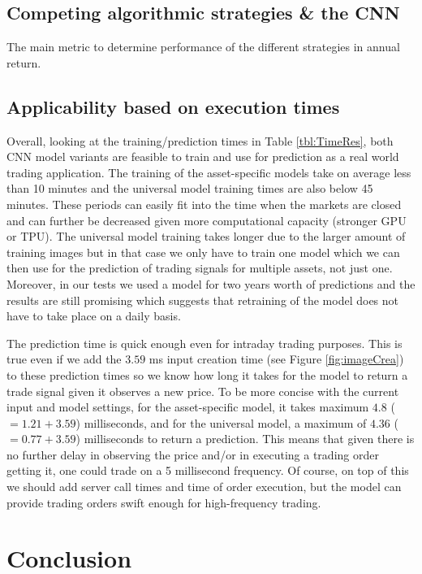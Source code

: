 \documentclass[11pt, a4paper]{article}
\begin{document}
\subsection{Competing algorithmic strategies \& the CNN}

The main metric to determine performance of the different strategies in annual return. 

\subsection{Applicability based on execution times}

Overall, looking at the training/prediction times in Table \ref{tbl:TimeRes}, both CNN model variants are feasible to train and use for prediction as a real world trading application. The training of the asset-specific models take on average less than 10 minutes and the universal model training times are also below 45 minutes. These periods can easily fit into the time when the markets are closed and can further be decreased given more computational capacity (stronger GPU or TPU). The universal model training takes longer due to the larger amount of training images but in that case we only have to train one model which we can then use for the prediction of trading signals for multiple assets, not just one.
Moreover, in our tests we used a model for two years worth of predictions and the results are still promising which suggests that retraining of the model does not have to take place on a daily basis. 

The prediction time is quick enough even for intraday trading purposes. This is true even if we add the $3.59$ ms input creation time (see Figure \ref{fig:imageCrea}) to these prediction times so we know how long it takes for the model to return a trade signal given it observes a new price. To be more concise with the current input and model settings, for the asset-specific model, it takes maximum $4.8$ ($=1.21 + 3.59$) milliseconds, and for the universal model, a maximum of $4.36$ ($=0.77 + 3.59$) milliseconds to return a prediction. This means that given there is no further delay in observing the price and/or in executing a trading order getting it, one could trade on a 5 millisecond frequency. Of course, on top of this we should add server call times and time of order execution, but the model can provide trading orders swift enough for high-frequency trading.

\section{Conclusion}
\label{sec:Conclusion}
\end{document}
